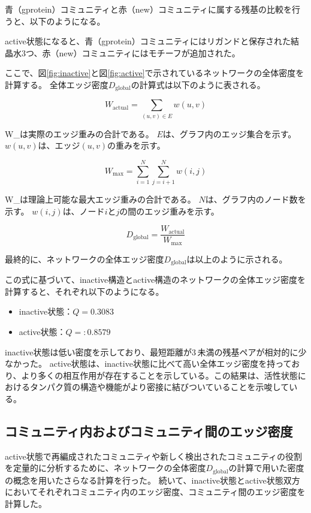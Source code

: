 青（gprotein）コミュニティと赤（new）コミュニティに属する残基の比較を行うと、以下のようになる。


active状態になると、青（gprotein）コミュニティにはリガンドと保存された結晶水3つ、赤（new）コミュニティにはモチーフが追加された。

ここで、図\ref{fig:inactive}と図\ref{fig:active}で示されているネットワークの全体密度を計算する。
全体エッジ密度$D_{\text{global}}$の計算式は以下のように表される。

\[
W_{\text{actual}} = \sum_{(u, v) \in E} w(u, v)
\]

W_{}は実際のエッジ重みの合計である。
$E$は、グラフ内のエッジ集合を示す。
$w(u, v)$は、エッジ$(u, v)$の重みを示す。

\[
W_{\text{max}} = \sum_{i=1}^{N} \sum_{j=i+1}^{N} w(i, j)
\]

W_{}は理論上可能な最大エッジ重みの合計である。
$N$は、グラフ内のノード数を示す。
$w(i, j)$は、ノード$i$と$j$の間のエッジ重みを示す。

\[
D_{\text{global}} = \frac{W_{\text{actual}}}{W_{\text{max}}}
\label{eq:global_density}
\]

最終的に、ネットワークの全体エッジ密度$D_{\text{global}}$は以上のように示される。

この式に基づいて、inactive構造とactive構造のネットワークの全体エッジ密度を計算すると、それぞれ以下のようになる。
\begin{itemize}
    \item inactive状態：\( Q = 0.3083 \)
    \item active状態：\( Q = :0.8579 \)
\end{itemize}

inactive状態は低い密度を示しており、最短距離が3\,\text{\AA}未満の残基ペアが相対的に少なかった。
active状態は、inactive状態に比べて高い全体エッジ密度を持っており、より多くの相互作用が存在することを示している。この結果は、活性状態におけるタンパク質の構造や機能がより密接に結びついていることを示唆している。

\subsection{コミュニティ内およびコミュニティ間のエッジ密度}
active状態で再編成されたコミュニティや新しく検出されたコミュニティの役割を定量的に分析するために、ネットワークの全体密度$D_{\text{global}}$の計算で用いた密度の概念を用いたさらなる計算を行った。
続いて、inactive状態とactive状態双方においてそれぞれコミュニティ内のエッジ密度、コミュニティ間のエッジ密度を計算した。

